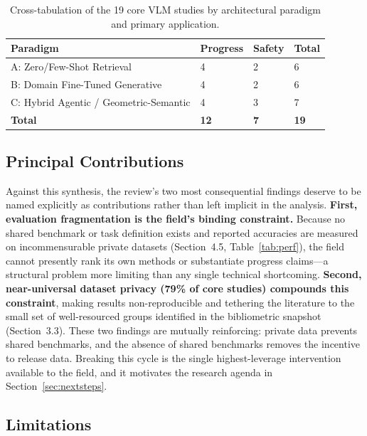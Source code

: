 \documentclass[10pt,letterpaper]{article}
\begin{document}
\begin{table}[H]
\caption{Cross-tabulation of the 19 core VLM studies by architectural paradigm and primary application.}
\label{tab:paradigmapp}
\small
{}
\begin{tabularx}{\textwidth}{L{4.6cm} Y Y Y}
\toprule
{}
\textbf{Paradigm} & \textbf{Progress} & \textbf{Safety} & \textbf{Total}\\
\midrule
A: Zero/Few-Shot Retrieval & 4 & 2 & 6\\
B: Domain Fine-Tuned Generative & 4 & 2 & 6\\
C: Hybrid Agentic / Geometric-Semantic & 4 & 3 & 7\\
\midrule
\textbf{Total} & \textbf{12} & \textbf{7} & \textbf{19}\\
\bottomrule
\end{tabularx}
\end{table}

\subsection{Principal Contributions}

Against this synthesis, the review's two most consequential findings deserve to be named explicitly as contributions rather than left implicit in the analysis. \textbf{First, evaluation fragmentation is the field's binding constraint.} Because no shared benchmark or task definition exists and reported accuracies are measured on incommensurable private datasets (Section~4.5, Table~\ref{tab:perf}), the field cannot presently rank its own methods or substantiate progress claims---a structural problem more limiting than any single technical shortcoming. \textbf{Second, near-universal dataset privacy (79\% of core studies) compounds this constraint}, making results non-reproducible and tethering the literature to the small set of well-resourced groups identified in the bibliometric snapshot (Section~3.3). These two findings are mutually reinforcing: private data prevents shared benchmarks, and the absence of shared benchmarks removes the incentive to release data. Breaking this cycle is the single highest-leverage intervention available to the field, and it motivates the research agenda in Section~\ref{sec:nextsteps}.

\subsection{Limitations}
\label{sec:limitations}
\end{document}

